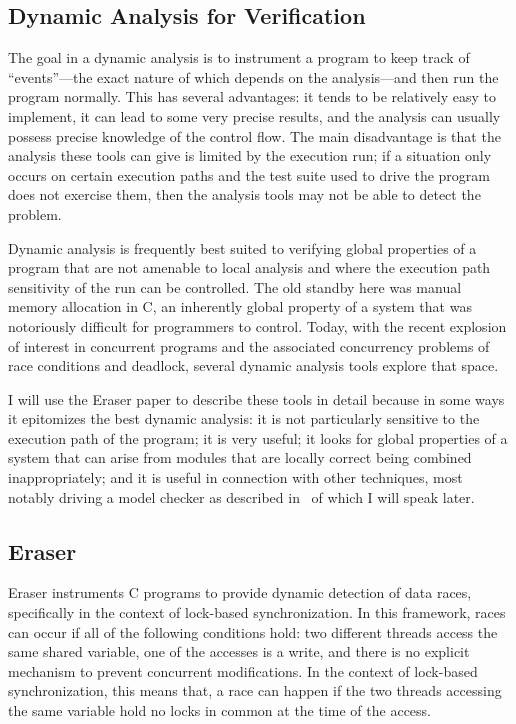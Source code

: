 \documentclass{article}
\begin{document}
\begin{multicols}{2}
\section{Dynamic Analysis for Verification}

The goal in a dynamic analysis is to instrument a program to keep
track of ``events''---the exact nature of which depends on the
analysis---and then run the program normally.  This has several
advantages: it tends to be relatively easy to implement, it can lead
to some very precise results, and the analysis can usually possess
precise knowledge of the control flow.  The main disadvantage is that
the analysis these tools can give is limited by the execution run; if
a situation only occurs on certain execution paths and the test suite
used to drive the program does not exercise them, then the analysis
tools may not be able to detect the problem.

Dynamic analysis is frequently best suited to verifying global
properties of a program that are not amenable to local analysis and
where the execution path sensitivity of the run can be controlled.
The old standby here was manual memory allocation in C, an inherently
global property of a system that was notoriously difficult for
programmers to control.  Today, with the recent explosion of interest
in concurrent programs and the associated concurrency problems of race
conditions and deadlock, several dynamic analysis tools explore that
space.

I will use the Eraser paper to describe these tools in detail because
in some ways it epitomizes the best dynamic analysis: it is not
particularly sensitive to the execution path of the program; it is
very useful; it looks for global properties of a system that can arise
from modules that are locally correct being combined inappropriately;
and it is useful in connection with other techniques, most notably
driving a model checker as described in~\cite{havelund00using} of
which I will speak later.

\subsection{Eraser~\cite{265927}}

Eraser instruments C programs to provide dynamic detection of data
races, specifically in the context of lock-based synchronization.  In
this framework, races can occur if all of the following conditions
hold: two different threads access the same shared variable, one of
the accesses is a write, and there is no explicit mechanism to prevent
concurrent modifications.  In the context of lock-based
synchronization, this means that, a race can happen if the two threads
accessing the same variable hold no locks in common at the time of the
access.


\end{multicols}
\end{document}
